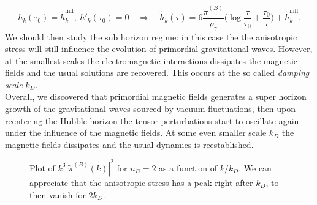 $$\tilde h_k(\tau_0)=\tilde h_k^\text{infl},\ \tilde h'_k(\tau_0)=0 \quad \Rightarrow\quad \tilde h_k(\tau) = 6 \frac{\tilde\pi^{(B)}}{\bar\rho_\gamma}\bigg(\log\frac{\tau}{\tau_0}+\frac{\tau_0}{\tau}\bigg)+\tilde h_k^\text{infl}.$$
We should then study the sub horizon regime: in this case the the anisotropic stress will still influence the evolution of primordial gravitational waves. However, at the smallest scales the electromagnetic interactions dissipates the magnetic fields and the usual solutions are recovered. This occurs at the so called \emph{damping scale} $k_D$.\\Overall, we discovered that primordial magnetic fields generates a super horizon growth of the gravitational waves sourced by vacuum fluctuations, then upon reentering the Hubble horizon the tensor perturbations start to oscillate again under the influence of the magnetic fields. At some even smaller scale $k_D$ the magnetic fields dissipates and the usual dynamics is reestablished.  
\begin{figure}
    \centering
    \caption{Plot of $k^3 |\tilde{\pi}^{(B)}(k)|^2$ for $n_B=2$ as a function of $k/k_D$. We can appreciate that the anisotropic stress has a peak right after $k_D$, to then vanish for $2k_D$.}
    \label{fig:stress_B}
\end{figure}

